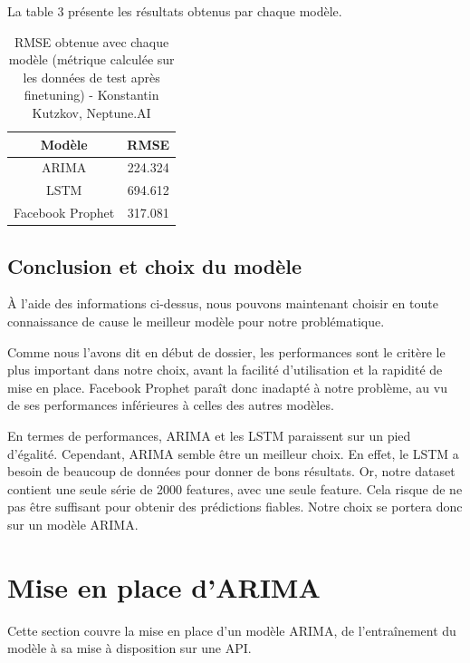 \documentclass[french]{article}
\begin{document}
    La table 3 présente les résultats obtenus par chaque modèle.
    \begin{table}[h!]
        \begin{center}
            \begin{tabular}{ |c|c| }
                \hline
                Modèle & RMSE \\
                \hline
                ARIMA & 224.324 \\ 
                \hline
                LSTM & 694.612 \\  
                \hline
                Facebook Prophet & 317.081 \\
                \hline
            \end{tabular}
            \caption{RMSE obtenue avec chaque modèle (métrique calculée sur les données de test après finetuning) - Konstantin Kutzkov, Neptune.AI}
            \label{table:1}
        \end{center}
    \end{table}

    \subsection{Conclusion et choix du modèle}
    À l'aide des informations ci-dessus, nous pouvons maintenant choisir en toute connaissance de cause le meilleur modèle pour notre problématique.

    Comme nous l'avons dit en début de dossier, les performances sont le critère le plus important dans notre choix, avant la facilité d'utilisation et la rapidité de mise en place. Facebook Prophet paraît donc inadapté à notre problème, au vu de ses performances inférieures à celles des autres modèles.

    En termes de performances, ARIMA et les LSTM paraissent sur un pied d'égalité. Cependant, ARIMA semble être un meilleur choix. En effet, le LSTM a besoin de beaucoup de données pour donner de bons résultats. Or, notre dataset contient une seule série de 2000 features, avec une seule feature. Cela risque de ne pas être suffisant pour obtenir des prédictions fiables. Notre choix se portera donc sur un modèle ARIMA.
    
    \section{Mise en place d'ARIMA}

    Cette section couvre la mise en place d'un modèle ARIMA, de l'entraînement du modèle à sa mise à disposition sur une API.
\end{document}

